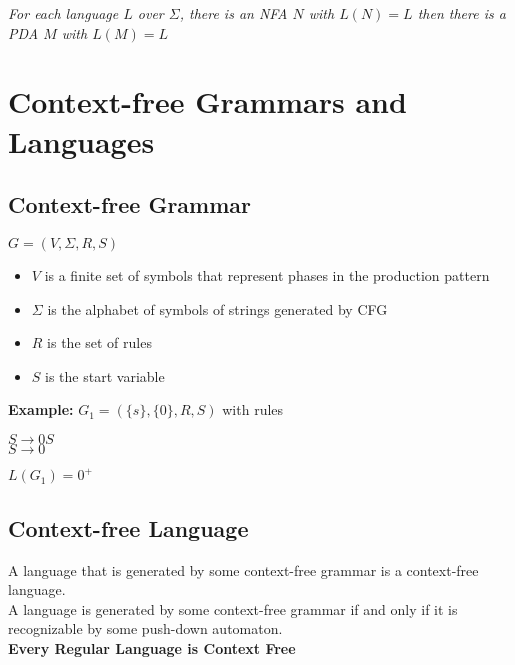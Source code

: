 \documentclass{article}
\begin{document}
\begin{enumerate}
\end{enumerate}
\textit{For each language $L$ over $\Sigma$, there is an NFA $N$ with $L(N)=L$ then there is a PDA $M$ with $L(M)=L$}
\section{Context-free Grammars and Languages}
\label{sec:contextFree}
\subsection{Context-free Grammar}
$G=(V,\Sigma,R,S)$
\begin{itemize}
    \item $V$ is a finite set of symbols that represent phases in the production pattern
    \item $\Sigma$ is the alphabet of symbols of strings generated by CFG
    \item $R$ is the set of rules 
    \item $S$ is the start variable
\end{itemize}
\textbf{Example:} $G_1=(\{s\},\{0\},R,S)$ with rules
\begin{center}
    $S\rightarrow0S$\\
    $S\rightarrow0$
\end{center}
$L(G_1)=0^+$
\subsection{Context-free Language}
A language that is generated by some context-free grammar is a context-free language.\\
\newline
A language is generated by some context-free grammar if and only if it is recognizable by some push-down automaton.\\
\newlinw
\textbf{Every Regular Language is Context Free}
\newpage
\end{document}
